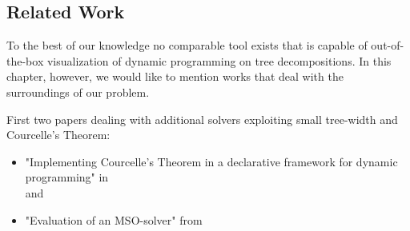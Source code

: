 \documentclass[a4paper, 12pt, bibliography=totoc]{scrartcl}
\begin{document}
\subsection{Related Work}

To the best of our knowledge no comparable tool exists that is capable of out-of-the-box visualization of dynamic programming on tree decompositions.
In this chapter, however, we would like to mention works that deal with the surroundings of our problem.

First two papers dealing with additional solvers exploiting small tree-width and Courcelle's Theorem:
\begin{itemize}
	\item "Implementing Courcelle's Theorem in a declarative framework for dynamic programming" in \cite{ImplCourcelleDP16} \\
	and
	\item "Evaluation of an MSO-solver" from \cite{evaluationMSO}
\end{itemize}
%

\end{document}
